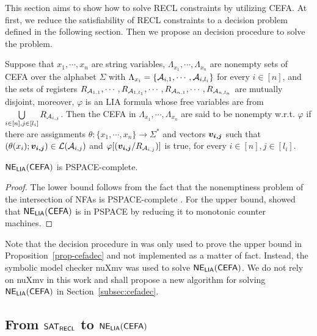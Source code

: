 
This section aims to show how to solve RECL constraints by utilizing CEFA. 
At first, we reduce the satisfiability of RECL constraints to a decision problem defined in the following section. Then we propose an decision procedure to solve the problem. 

\begin{definition}
Suppose that $x_1, \cdots, x_n$ are string variables, $\Lambda_{x_1}, \cdots, \Lambda_{x_n}$ are nonempty sets of CEFA over the alphabet $\Sigma$ with $\Lambda_{x_i} = \{\mathcal{A}_{i, 1}, \cdots, \mathcal{A}_{i, l_i}\}$ for every $i \in [n]$, and the sets of registers $R_{\mathcal{A}_{1, 1}}, \cdots, R_{\mathcal{A}_{1, l_1}}, \cdots, R_{\mathcal{A}_{n, 1}}, \cdots, R_{\mathcal{A}_{n, l_n}}$ are mutually disjoint, moreover, $\varphi$ is an LIA formula whose free variables are from $ \bigcup \limits_{i \in [n], j \in [l_i]} R_{\mathcal{A}_{i, j}}$. Then  the CEFA in $\Lambda_{x_1}, \cdots, \Lambda_{x_n}$ are said to be nonempty w.r.t. $\varphi$ if there are assignments $\theta: \{x_1, \cdots, x_n\} \rightarrow \Sigma^*$ and vectors $\myvec{v_{i,j}}$
such that $(\theta(x_i); \myvec{v_{i,j}}) \in \Lang(\aut_{i, j})$ and  $\varphi[(\myvec{v_{i,j}}/R_{\aut_{i,j}})]$ is true, for every $i \in [n], j \in [l_i]$.
\end{definition}
\begin{proposition}\label{prop-cefadec}
${\sf NE_{LIA}(CEFA)}$ is PSPACE-complete. 
\end{proposition}
\begin{proof}
  The lower bound follows from the fact that the nonemptiness problem of the intersection of NFAs is PSPACE-complete \cite{pspace_int}. For the upper bound, \cite{atva2020} showed that ${\sf NE_{LIA}(CEFA)}$ is in PSPACE by reducing it to monotonic counter machines.
\end{proof}
Note that the decision procedure in \cite{atva2020} was only used to prove the upper bound in Proposition~\ref{prop-cefadec} and not implemented as a matter of fact. Instead, the symbolic model checker nuXmv was used to solve ${\sf NE_{LIA}(CEFA)}$. We do not rely on nuXmv in this work and shall propose a new algorithm for solving ${\sf NE_{LIA}(CEFA)}$ in Section~\ref{subsec:cefadec}. 

\subsection{From ${\sf SAT_{RECL}}$ to ${\sf NE_{LIA}(CEFA)}$} \label{subsec:regex2cefa}


